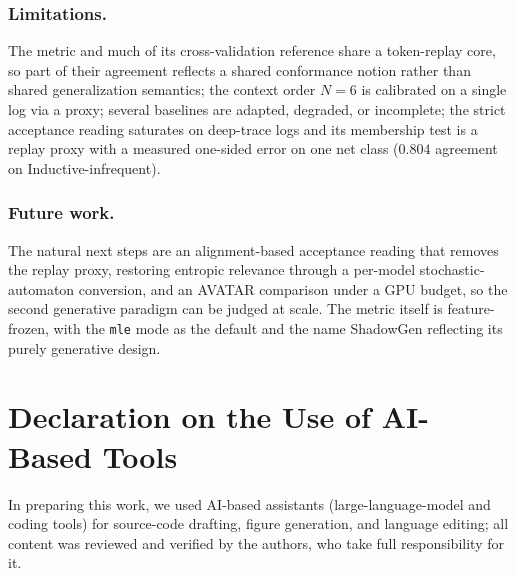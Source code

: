 \documentclass[runningheads]{llncs}
\newcommand{\chg}[1]{\textcolor{chgblue}{#1}}
\begin{document}
\subsubsection{Limitations.}
The metric and much of its cross-validation reference share a token-replay core, so part of their agreement reflects a shared conformance notion rather than shared generalization semantics; the context order $N{=}6$ is calibrated on a single log via a proxy; several baselines are adapted, degraded, or incomplete\chg{; the strict acceptance reading saturates on deep-trace logs and its membership test is a replay proxy with a measured one-sided error on one net class ($0.804$ agreement on Inductive-infrequent)}.

\subsubsection{Future work.}
\chg{The natural next steps are an alignment-based acceptance reading that removes the replay proxy, restoring entropic relevance through a per-model stochastic-automaton conversion, and an AVATAR comparison under a GPU budget, so the second generative paradigm can be judged at scale.} The metric itself is feature-frozen, with the \texttt{mle} mode as the default and the name ShadowGen reflecting its purely generative design.

\section*{Declaration on the Use of AI-Based Tools}
In preparing this work, we used AI-based assistants (large-language-model and coding
tools) for source-code drafting, figure generation, and language editing; all content
was reviewed and verified by the authors, who take full responsibility for it.



\end{document}
